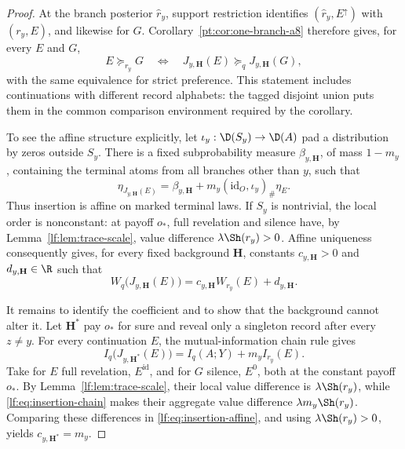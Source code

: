 \begin{proof}
At the branch posterior $\widehat r_y$, support restriction identifies
$(\widehat r_y,E^\uparrow)$ with $(r_y,E)$, and likewise for $G$.
Corollary~\ref{pt:cor:one-branch-a8} therefore gives, for every $E$ and $G$,
\[
E\succeq_{r_y}G
\quad\Longleftrightarrow\quad
J_{y,\mathbf H}(E)\succeq_qJ_{y,\mathbf H}(G),
\]
with the same equivalence for strict preference.  This statement includes
continuations with different record alphabets: the tagged disjoint union puts
them in the common comparison environment required by the corollary.

To see the affine structure explicitly, let
$\iota_y:\D(S_y)\to\D(A)$ pad a distribution by zeros outside $S_y$.
There is a fixed subprobability measure $\beta_{y,\mathbf H}$, of mass
$1-m_y$, containing the terminal atoms from all branches other than $y$, such
that
\[
\eta_{J_{y,\mathbf H}(E)}
=\beta_{y,\mathbf H}
 +m_y(\mathrm{id}_O,\iota_y)_\#\eta_E.
\]
Thus insertion is affine on marked terminal laws.  If $S_y$ is nontrivial,
the local order is nonconstant: at payoff $o_\ast$, full revelation and
silence have, by Lemma~\ref{lf:lem:trace-scale}, value difference
$\lambda\Sh(r_y)>0$.  Affine
uniqueness consequently gives, for every fixed background $\mathbf H$,
constants $c_{y,\mathbf H}>0$ and $d_{y,\mathbf H}\in\R$ such that
\begin{equation}
W_q\bigl(J_{y,\mathbf H}(E)\bigr)
=c_{y,\mathbf H}W_{r_y}(E)+d_{y,\mathbf H}.
\label{lf:eq:insertion-affine}
\end{equation}

It remains to identify the coefficient and to show that the background cannot
alter it.  Let $\mathbf H^\ast$ pay $o_\ast$ for sure and reveal only a
singleton record after every $z\ne y$.  For every continuation $E$, the
mutual-information chain rule gives
\begin{equation}
I_q\bigl(J_{y,\mathbf H^\ast}(E)\bigr)
=I_q(A;Y)+m_y I_{r_y}(E).
\label{lf:eq:insertion-chain}
\end{equation}
Take for $E$ full revelation, $E^{\mathrm{id}}$, and for $G$ silence,
$E^0$, both at the constant payoff $o_\ast$.  By
Lemma~\ref{lf:lem:trace-scale}, their local value difference is
$\lambda\Sh(r_y)$, while \eqref{lf:eq:insertion-chain} makes their aggregate
value difference $\lambda m_y\Sh(r_y)$.  Comparing these differences in
\eqref{lf:eq:insertion-affine}, and using
$\lambda\Sh(r_y)>0$, yields
$c_{y,\mathbf H^\ast}=m_y$.


\end{proof}

